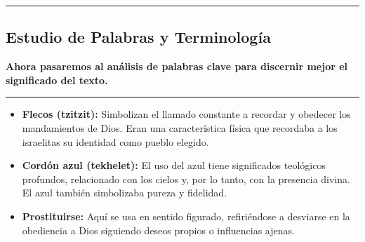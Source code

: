 {\color{gray}\hrule}
\begin{center}
\section{Estudio de Palabras y Terminología}
\textbf{Ahora pasaremos al análisis de palabras clave para discernir mejor el significado del texto.}
\end{center}
{\color{gray}\hrule}

\begin{multicols}{2}

  \begin{itemize}
    \item \textbf{Flecos (tzitzit):} Simbolizan el llamado constante a recordar y obedecer los mandamientos de Dios. Eran una característica física que recordaba a los israelitas su identidad como pueblo elegido.
    \item \textbf{Cordón azul (tekhelet):} El uso del azul tiene significados teológicos profundos, relacionado con los cielos y, por lo tanto, con la presencia divina. El azul también simbolizaba pureza y fidelidad.
    \item \textbf{Prostituirse:} Aquí se usa en sentido figurado, refiriéndose a desviarse en la obediencia a Dios siguiendo deseos propios o influencias ajenas.
  \end{itemize}

\end{multicols}

